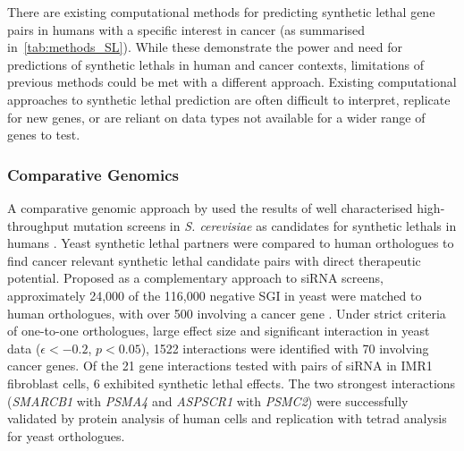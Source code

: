 There are existing computational methods for predicting \gls{synthetic lethal} gene pairs in humans with a specific interest in cancer (as summarised in~\ref{tab:methods_SL}). While these demonstrate the power and need for predictions of \glspl{synthetic lethal} in human and cancer contexts, limitations of previous methods could be met with a different approach. Existing computational approaches to \gls{synthetic lethal} prediction are often difficult to interpret, replicate for new genes, or are reliant on data types not available for a wider range of genes to test.  

\subsubsection{Comparative Genomics}

A comparative \gls{genomic} approach by \citet{Deshpande2013} used the results of well characterised high-throughput \gls{mutation} screens in \textit{S. cerevisiae} as candidates for \glspl{synthetic lethal} in humans \citep{Baryshnikova2010a, Costanzo2010, Costanzo2011, Tong2001, Tong2004}. Yeast \gls{synthetic lethal} partners were compared to human orthologues to find cancer relevant \gls{synthetic lethal} candidate pairs with direct therapeutic potential. Proposed as a complementary approach to \gls{siRNA} screens, approximately 24,000 of the 116,000 negative \gls{SGI} in yeast \citep{Costanzo2011} were matched to human orthologues, with over 500 involving a \gls{cancer gene} \citep{Futreal2004}. Under strict criteria of one-to-one orthologues, large effect size and significant interaction in yeast data ($\epsilon < -0.2$, $p < 0.05$), 1522 interactions were identified with 70 involving \glspl{cancer gene}. Of the 21 gene interactions tested with pairs of \gls{siRNA} in IMR1 fibroblast cells, 6 exhibited \gls{synthetic lethal} effects. The two strongest interactions (\textit{SMARCB1} with \textit{PSMA4} and \textit{ASPSCR1} with \textit{PSMC2}) were successfully validated by protein analysis of human cells and replication with tetrad analysis for yeast orthologues.

